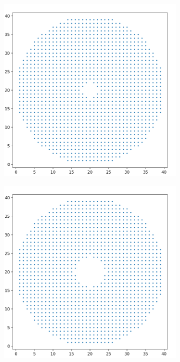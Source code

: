\documentclass[10pt]{article}
\begin{document}
\begin{figure}[H]
\begin{subfigure}[h]{0.2\textwidth}
    \end{subfigure}%
    \begin{subfigure}[h]{0.2\textwidth}
        \includegraphics[width=\linewidth]{mh_3}
    \end{subfigure}%
    \begin{subfigure}[h]{0.2\textwidth}
        \includegraphics[width=\linewidth]{mh_4}
    \end{subfigure}%


\end{figure}
\end{document}
